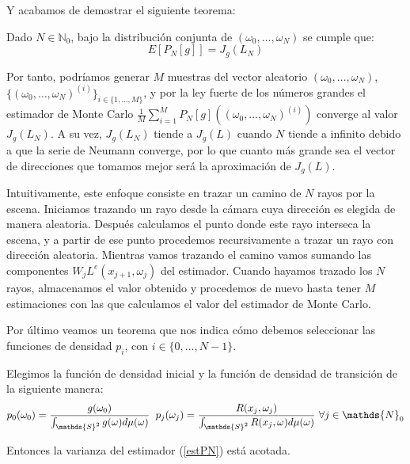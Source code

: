 Y acabamos de demostrar el siguiente teorema:

\begin{teorema}
  Dado $N\in\mathds{N}_0$, bajo la distribución conjunta de $(\omega_0,\ldots ,\omega_N)$ se cumple que:
  $$E[P_N[g]] = J_g(L_N)$$
\end{teorema}

Por tanto, podríamos generar $M$ muestras del vector aleatorio $(\omega_0,\ldots ,\omega_N)$, $\{(\omega_0,\ldots ,\omega_N)^{(i)}\}_{i\in\{1,\ldots,M\}}$, y por la ley fuerte de los números grandes el estimador de Monte Carlo $\frac{1}{M}\sum_{i=1}^MP_N[g]((\omega_0,\ldots ,\omega_N)^{(i)})$ converge al valor $J_g(L_N)$. A su vez, $J_g(L_N)$ tiende a $J_g(L)$ cuando $N$ tiende a infinito debido a que la serie de Neumann converge, por lo que cuanto más grande sea el vector de direcciones que tomamos mejor será la aproximación de $J_g(L)$.

Intuitivamente, este enfoque consiste en trazar un camino de $N$ rayos por la escena. Iniciamos trazando un rayo desde la cámara cuya dirección es elegida de manera aleatoria. Después calculamos el punto donde este rayo interseca la escena, y a partir de ese punto procedemos recursivamente a trazar un rayo con dirección aleatoria. Mientras vamos trazando el camino vamos sumando las componentes $W_jL^e(x_{j+1},\omega_j)$ del estimador. Cuando hayamos trazado los $N$ rayos, almacenamos el valor obtenido y procedemos de nuevo hasta tener $M$ estimaciones con las que calculamos el valor del estimador de Monte Carlo. 

Por último veamos un teorema que nos indica cómo debemos seleccionar las funciones de densidad $p_i$, con $i\in\{0,\ldots, N-1\}$.

\begin{teorema}
  Elegimos la función de densidad inicial y la función de densidad de transición de la siguiente manera:
  \begin{equation}
p_0(\omega_0) = \frac{g(\omega_0)}{\int_{\mathds{S}^2}g(\omega)d\mu(\omega)}\hspace{0.2cm} p_j(\omega_j)=\frac{R(x_j,\omega_j)}{\int_{\mathds{S}^2}R(x_j, \omega)d\mu(\omega)}\text{ }\forall j\in\mathds{N}_0
  \end{equation}

  Entonces la varianza del estimador (\ref{estPN}) está acotada.
\end{teorema}

